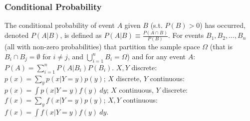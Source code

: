 \subsubsection*{Conditional Probability}
 The conditional probability of event $A$ given $B$ (s.t. $P(B) > 0$) has occurred, denoted $P(A|B)$, is defined as $P(A|B) \equiv \frac{P(A\cap B)}{P(B)}$.
 For events $B_1, B_2, \ldots, B_n$ (all with non-zero probabilities) that partition the sample space $\Omega$ (that is $B_i \cap B_j = \emptyset$ for $i \ne j$, and $\bigcup^{n}_{i=1}B_i = \Omega$) and for any event $A$: 
$P(A) = \sum^{n}_{i=1}P(A|B_i)P(B_i)$.
$X,Y$ discrete: $p(x) = \sum_y p(x|Y=y)p(y)$; 
$X$ discrete, $Y$ continuous: $p(x) = \int p(x|Y=y)f(y)\ dy$; 
$X$ continuous, $Y$ discrete: $f(x) = \sum_y f(x|Y=y)p(y)$; 
$X,Y$ continuous: $f(x) = \int f(x|Y=y)f(y)\ dy$.